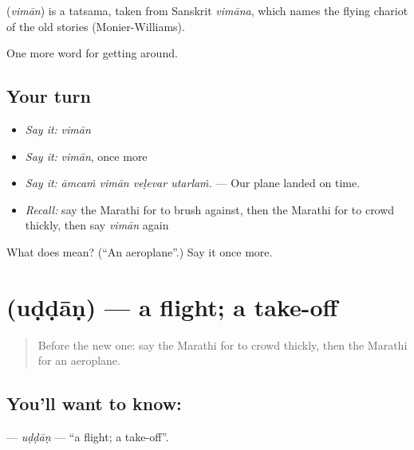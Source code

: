 \begin{cousinweb}
\textbf{} (\emph{vimān}) is a tatsama, taken from Sanskrit \emph{vimāna}, which names the flying chariot of the old stories (Monier-Williams).
\end{cousinweb}

\begin{grammarlens}[title={What you've built}]
One more word for getting around.
\end{grammarlens}

\subsection*{Your turn}
\begin{itemize}
\raggedright
  \item \emph{Say it:} \emph{vimān}
  \item \emph{Say it:} \emph{vimān}, once more
  \item \emph{Say it:} \emph{āmcaṁ vimān veḷevar utarlaṁ.} — Our plane landed on time.
  \item \emph{Recall:} say the Marathi for to brush against, then the Marathi for to crowd thickly, then say \emph{vimān} again
\end{itemize}

\begin{tcolorbox}[breakable,colback=teal!4,colframe=teal!35!black,title={Before you move on}]
What does  mean? (\textquotedblleft{}An aeroplane\textquotedblright{}.) Say it once more.
\end{tcolorbox}
\section[\texorpdfstring{\mr{उड्डाण} (uḍḍāṇ)}{उड्डाण (uḍḍāṇ)}]{ (uḍḍāṇ) — a flight; a take-off}

\label{lesson:MR-C405-uddan}



\begin{quote}
Before the new one: say the Marathi for to crowd thickly, then the Marathi for an aeroplane.
\end{quote}

\subsection*{You'll want to know: }
\textbf{} — \emph{uḍḍāṇ} — \textquotedblleft{}a flight; a take-off\textquotedblright{}.

